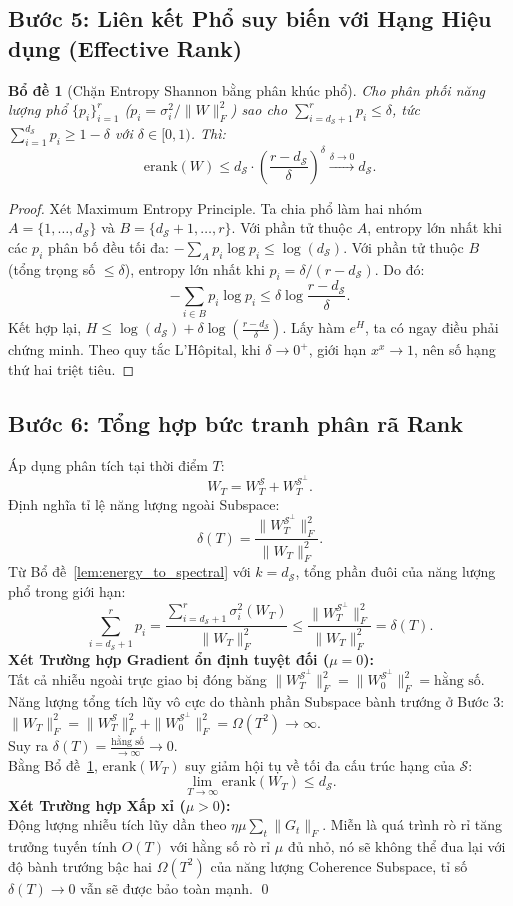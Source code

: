 \documentclass[11pt,a4paper]{article}
\newtheorem{lemma}{Bổ đề}
\newcommand{\erank}{\mathrm{erank}}
\newcommand{\cS}{\mathcal{S}}
\begin{document}
\subsection{Bước 5: Liên kết Phổ suy biến với Hạng Hiệu dụng (Effective Rank)}

\begin{lemma}[Chặn Entropy Shannon bằng phân khúc phổ]
\label{lem:entropy_conc}
Cho phân phối năng lượng phổ $\{p_i\}_{i=1}^r$ ($p_i = \sigma_i^2 / \|W\|_F^2$) sao cho $\sum_{i=d_{\cS}+1}^r p_i \le \delta$, tức $\sum_{i=1}^{d_{\cS}} p_i \geq 1-\delta$ với $\delta \in [0,1)$. Thì:
\[
\erank(W) \leq d_{\cS} \cdot \left(\frac{r-d_{\cS}}{\delta}\right)^{\delta} \xrightarrow{\delta \to 0} d_{\cS}.
\]
\end{lemma}
\begin{proof}
Xét Maximum Entropy Principle. Ta chia phổ làm hai nhóm $A=\{1, \dots, d_{\cS}\}$ và $B=\{d_{\cS}+1, \dots, r\}$.
Với phần tử thuộc $A$, entropy lớn nhất khi các $p_i$ phân bố đều tối đa: $-\sum_{A} p_i \log p_i \leq \log(d_{\cS})$.
Với phần tử thuộc $B$ (tổng trọng số $\le \delta$), entropy lớn nhất khi $p_i = \delta / (r-d_{\cS})$. Do đó:
\[
-\sum_{i \in B} p_i \log p_i \leq \delta \log \frac{r-d_{\cS}}{\delta}.
\]
Kết hợp lại, $H \leq \log(d_{\cS}) + \delta \log \left( \frac{r-d_{\cS}}{\delta} \right)$. Lấy hàm $e^H$, ta có ngay điều phải chứng minh. Theo quy tắc L'Hôpital, khi $\delta \to 0^+$, giới hạn $x^x \to 1$, nên số hạng thứ hai triệt tiêu.
\end{proof}

\subsection{Bước 6: Tổng hợp bức tranh phân rã Rank}

Áp dụng phân tích tại thời điểm $T$:
\[
W_T = W_T^\cS + W_T^{\cS^\perp}.
\]
Định nghĩa tỉ lệ năng lượng ngoài Subspace:
\[
\delta(T) = \frac{\|W_T^{\cS^\perp}\|_F^2}{\|W_T\|_F^2}.
\]
Từ Bổ đề~\ref{lem:energy_to_spectral} với $k = d_{\cS}$, tổng phần đuôi của năng lượng phổ trong giới hạn:
\[
\sum_{i=d_{\cS}+1}^{r} p_i = \frac{\sum_{i=d_{\cS}+1}^r \sigma_i^2(W_T)}{\|W_T\|_F^2} \le \frac{\|W_T^{\cS^\perp}\|_F^2}{\|W_T\|_F^2} = \delta(T).
\]
\textbf{Xét Trường hợp Gradient ổn định tuyệt đối ($\mu = 0$):} \\
Tất cả nhiễu ngoài trực giao bị đóng băng $\|W_T^{\cS^\perp}\|_F^2 = \|W_0^{\cS^\perp}\|_F^2 = \text{hằng số}$. \\
Năng lượng tổng tích lũy vô cực do thành phần Subspace bành trướng ở Bước 3: $\|W_T\|_F^2 = \|W_T^\cS\|_F^2 + \|W_0^{\cS^\perp}\|_F^2 = \Omega(T^2) \to \infty$. \\
Suy ra $\delta(T) = \frac{\text{hằng số}}{\to \infty} \to 0$. \\
Bằng Bổ đề~\ref{lem:entropy_conc}, $\erank(W_T)$ suy giảm hội tụ về tối đa cấu trúc hạng của $\cS$:
\[
\boxed{\lim_{T\to\infty} \erank(W_T) \leq d_{\cS}}.
\]
\textbf{Xét Trường hợp Xấp xỉ ($\mu > 0$):} \\
Động lượng nhiễu tích lũy dần theo $\eta \mu \sum_t \|G_t\|_F$. Miễn là quá trình rò rỉ tăng trưởng tuyến tính $O(T)$ với hằng số rò rỉ $\mu$ đủ nhỏ, nó sẽ không thể đua lại với độ bành trướng bậc hai $\Omega(T^2)$ của năng lượng Coherence Subspace, tỉ số $\delta(T) \to 0$ vẫn sẽ được bảo toàn mạnh. \qed
\end{document}
